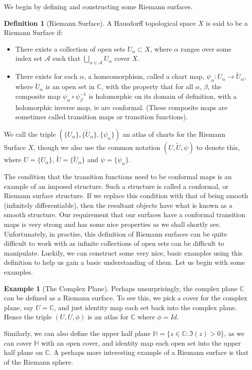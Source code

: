 \documentclass[11pt]{report}
\theoremstyle{definition}
\newtheorem{defn}[thm]{Definition}
\newtheorem{example}[thm]{Example}
\begin{document}
We begin by defining and constructing some Riemann surfaces.

\begin{defn}[Riemann Surface]\label{rsdefn}
A Hausdorff topological space $X$ is said to be a Riemann Surface if:
\begin{itemize}
\item There exists a collection of open sets $U_{\alpha} \subset X$, where
  $\alpha$ ranges over some index set $\mathcal{A}$ such that $\bigcup\limits_{\alpha \in \mathcal{A}} 
  U_{\alpha}$ cover $X$.
\item There exists for each $\alpha$, a homeomorphism, called a chart map,
  $ \psi_{\alpha}\colon U_{\alpha} \rightarrow \tilde{U}_{\alpha}$, where $\tilde{U}_{\alpha}$ is 
  an open set in $\mathbb{C}$, with the property that for all $\alpha$,
  $\beta$, the composite map $\psi_{\alpha} \circ \psi_{\beta}^{-1}$ is
  holomorphic on its domain of definition, with a holomorphic inverse map, ie are conformal. (These composite maps are sometimes called transition maps or transition functions).
\end{itemize}
We call the triple $(\{U_\alpha\},\{\tilde{U}_{\alpha}\},
\{\psi_\alpha\})$ an 
atlas of 
charts for the Riemann Surface $X$, though we also use the common
notation $(U,
\tilde{U}, \psi)$ to denote this, where $U=\{U_\alpha\}$,
$\tilde{U}=\{\tilde{U}
_{\alpha}\}$ and $\psi=\{\psi_\alpha\}$.
\end{defn}
The condition that the transition functions need to be conformal maps is an example of an imposed structure. Such a structure is called a conformal, or Riemann surface structure. If we replace this condition with that of being smooth (infinitely differentiable), then the resultant objects have what is known as a smooth structure. Our requirement that our surfaces have a conformal transition maps is very strong and has some nice properties as we shall shortly see. Unfortunately, in practise, this definition of Riemann surfaces can be quite difficult to work with as infinite collections of open sets can be difficult to manipulate. Luckily, we can construct some very nice, basic examples using this definition to help us gain a basic understanding of them. Let us begin with some examples.
\begin{example}[The Complex Plane]
  Perhaps unsurprisingly, the complex plane $\mathbb{C}$ can be defined as a Riemann surface. To see this, we pick a cover for the complex plane, say $U = \mathbb{C}$, and just identity map each set back into the complex plane. Hence the triple $(U,U,\phi)$ is an atlas for $\mathbb{C}$ where $\phi=Id$.
\end{example}
Similarly, we can also define the upper half plane $\mathbb{H}=\{ z \in \mathbb{C} \colon \Im(z)>0\}$, as we can cover $\mathbb{H}$ with an open cover, and identity map each open set into the upper half plane on $\mathbb{C}$. A perhaps more interesting example of a Riemann surface is that of the Riemann sphere.
\end{document}
